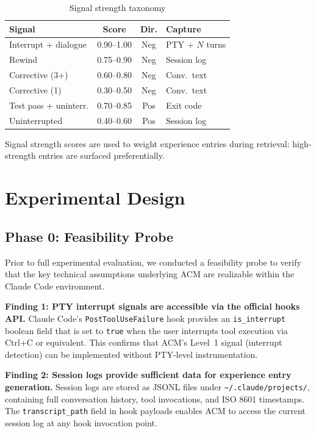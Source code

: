 \documentclass[conference]{IEEEtran}
\begin{document}
\begin{table}[h]
\centering
\caption{Signal strength taxonomy}
\label{tab:signals}
\small
\begin{tabular}{p{3.2cm}ccp{1.8cm}}
\toprule
\textbf{Signal} & \textbf{Score} & \textbf{Dir.} & \textbf{Capture} \\
\midrule
Interrupt + dialogue & 0.90--1.00 & Neg & PTY + $N$ turns \\
Rewind & 0.75--0.90 & Neg & Session log \\
Corrective (3+) & 0.60--0.80 & Neg & Conv.\ text \\
Corrective (1) & 0.30--0.50 & Neg & Conv.\ text \\
Test pass + uninterr. & 0.70--0.85 & Pos & Exit code \\
Uninterrupted & 0.40--0.60 & Pos & Session log \\
\bottomrule
\end{tabular}
\end{table}

Signal strength scores are used to weight experience entries during retrieval: high-strength entries are surfaced preferentially.

\section{Experimental Design}

\subsection{Phase 0: Feasibility Probe}

Prior to full experimental evaluation, we conducted a feasibility probe to verify that the key technical assumptions underlying ACM are realizable within the Claude Code environment.

\textbf{Finding 1: PTY interrupt signals are accessible via the official hooks API.}
Claude Code's \texttt{PostToolUseFailure} hook provides an \texttt{is\_interrupt} boolean field that is set to \texttt{true} when the user interrupts tool execution via Ctrl+C or equivalent. This confirms that ACM's Level~1 signal (interrupt detection) can be implemented without PTY-level instrumentation.

\textbf{Finding 2: Session logs provide sufficient data for experience entry generation.}
Session logs are stored as JSONL files under \texttt{\textasciitilde/.claude/projects/}, containing full conversation history, tool invocations, and ISO 8601 timestamps. The \texttt{transcript\_path} field in hook payloads enables ACM to access the current session log at any hook invocation point.
\end{document}
